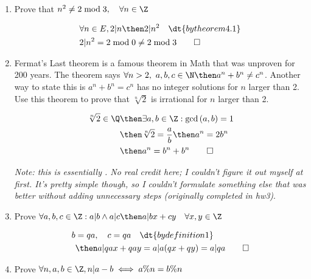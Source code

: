 \documentclass[basic, header]{nosvagor-notes}
\begin{document}
\begin{enumerate}[itemsep=4em]

  \item Prove that \(n^2 \neq 2 \bmod 3, \quad \forall n \in \Z \)


    \begin{align*}
      &\forall n \in E, 2|n  \then 2|n^2 \quad \dt{by theorem 4.1} \\
      &2|n^2 = 2 \bmod 0 \neq 2 \bmod 3 \qed
    \end{align*}

  \item Fermat’s Last theorem is a famous theorem in Math that was unproven for
    200 years. The theorem says \(\forall n > 2,~ a,b,c \in \N \then  a^n +
    b^n \neq c^n\). Another way to state this is \(a^n + b^n = c^n\) has no integer
    solutions for $n$ larger than 2. Use this theorem to prove that \(\sqrt[n]{2}\) is
    irrational for $n$ larger than 2.

    \begin{align*}
    \sqrt[n]{2} \in \Q &\then \exists a,b \in \Z : \gcd{(a,b)}=1 \\
                         &\then \sqrt[n]{2} = \frac{a}{b} \then a^n = 2b^n \\
                         &\then a^n = b^n + b^n \qed
    \end{align*}

    \textit{Note: this is essentially
      . No real
      credit here; I couldn't figure it out myself at first. It's pretty simple
      though, so I couldn't formulate something else that was better without
      adding unnecessary steps (originally completed in hw3)}.

  \newpage %

    \item Prove \(\forall a,b,c\in \Z : a|b \land a|c \then a|bx + cy \quad
      \forall x,y \in \Z\)

      \begin{align*}
        b &= qa, \quad c = qa \quad \dt{by definition 1} \\
            &\then a|qax+qay = a|a(qx+qy) = a|qa \qed
      \end{align*}

    \item Prove \(\forall  n,a,b \in \Z, n|a-b \iff a\%n = b\%n\)


\end{enumerate}
\end{document}
